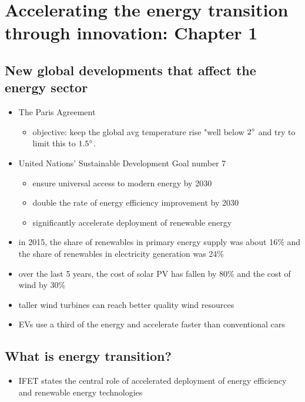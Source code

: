 \section{Accelerating the energy transition through innovation: Chapter 1}
\subsection{New global developments that affect the energy sector}

\begin{itemize}
	\item The Paris Agreement
	\begin{itemize}
		\item objective: keep the global avg temperature rise "well
		below $2 \degree$ and try to limit this to $1.5 \degree$.
	\end{itemize}
	\item United Nations' Sustainable Development Goal number 7
	\begin{itemize}
		\item ensure universal access to modern energy by 2030
		\item double the rate of energy efficiency improvement by 2030
		\item significantly accelerate deployment of renewable
		energy
	\end{itemize}
	\item in 2015, the share of renewables in primary energy supply was
	about 16\% and the share of renewables in electricity generation was
	24\%
	\item over the last 5 years, the cost of solar PV has fallen by 80\%
	and the cost of wind by 30\%
	\item taller wind turbines can reach better quality wind resources
	\item EVs use a third of the energy and accelerate faster than
	conventional cars
\end{itemize}

\subsection{What is energy transition?}
\begin{itemize}
	\item IFET states the central role of accelerated deployment of
	energy efficiency and renewable energy technologies
\end{itemize}

